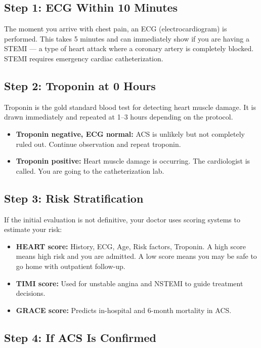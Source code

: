 \subsection{Step 1: ECG Within 10 Minutes}

The moment you arrive with chest pain, an ECG (electrocardiogram) is performed. This takes 5 minutes and can immediately show if you are having a STEMI --- a type of heart attack where a coronary artery is completely blocked. STEMI requires emergency cardiac catheterization.

\subsection{Step 2: Troponin at 0 Hours}

Troponin is the gold standard blood test for detecting heart muscle damage. It is drawn immediately and repeated at 1--3 hours depending on the protocol.

\begin{itemize}
    \item \textbf{Troponin negative, ECG normal:} ACS is unlikely but not completely ruled out. Continue observation and repeat troponin.
    \item \textbf{Troponin positive:} Heart muscle damage is occurring. The cardiologist is called. You are going to the catheterization lab.
\end{itemize}

\subsection{Step 3: Risk Stratification}

If the initial evaluation is not definitive, your doctor uses scoring systems to estimate your risk:

\begin{itemize}
    \item \textbf{HEART score:} History, ECG, Age, Risk factors, Troponin. A high score means high risk and you are admitted. A low score means you may be safe to go home with outpatient follow-up.
    \item \textbf{TIMI score:} Used for unstable angina and NSTEMI to guide treatment decisions.
    \item \textbf{GRACE score:} Predicts in-hospital and 6-month mortality in ACS.
\end{itemize}

\subsection{Step 4: If ACS Is Confirmed}

